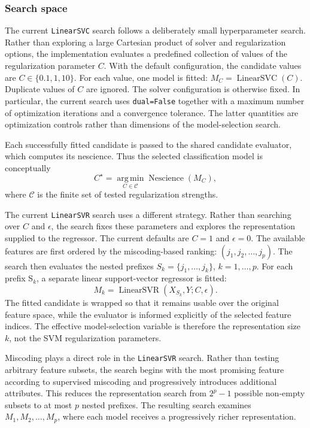 
\subsubsection{Search space}

The current \texttt{LinearSVC} search follows a deliberately small hyperparameter search. Rather than exploring a large Cartesian product of solver and regularization options, the implementation evaluates a predefined collection of values of the regularization parameter $C$. With the default configuration, the candidate values are $C \in \{0.1,1,10\}$. For each value, one model is fitted: $M_C = \operatorname{LinearSVC}(C)$. Duplicate values of $C$ are ignored. The solver configuration is otherwise fixed. In particular, the current search
uses \texttt{dual=False} together with a maximum number of optimization iterations and a convergence
tolerance. The latter quantities are optimization controls rather than dimensions of the model-selection search.

Each successfully fitted candidate is passed to the shared candidate evaluator, which computes its nescience. Thus the selected classification model is conceptually
\[
C^\star = \operatorname*{arg\,min}_{C\in\mathcal C} \operatorname{Nescience}(M_C),
\]
where $\mathcal C$ is the finite set of tested regularization strengths.

The current \texttt{LinearSVR} search uses a different strategy. Rather than searching over $C$ and $\epsilon$, the search fixes these parameters and explores the representation supplied to the regressor. The current defaults are $C=1$ and $\epsilon=0$. The available features are first ordered by the miscoding-based ranking: $(j_1, j_2, \ldots, j_p)$. The search then evaluates the nested prefixes $S_k = \{j_1,\ldots,j_k\}$, $k=1, \ldots, p$. For each prefix S$_k$, a separate linear support-vector regressor is fitted:
\[
M_k = \operatorname{LinearSVR} \left(X_{S_k}, Y; C, \epsilon \right).
\]
The fitted candidate is wrapped so that it remains usable over the original feature space, while the evaluator is informed explicitly of the selected feature indices. The effective model-selection variable is therefore the representation size $k$, not the SVM regularization parameters.

Miscoding plays a direct role in the \texttt{LinearSVR} search. Rather than testing arbitrary feature subsets, the search begins with the most promising feature according to supervised miscoding and progressively introduces
additional attributes. This reduces the representation search from $2^p-1$ possible non-empty subsets to at most $p$ nested prefixes. The resulting search examines $M_1, M_2, \ldots, M_p$, where each model receives a progressively richer representation.

